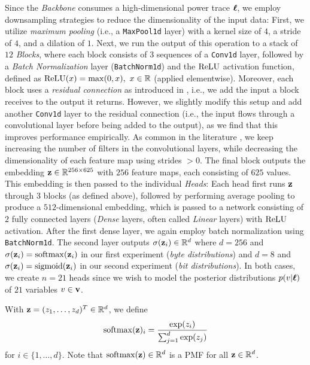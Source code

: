 Since the \emph{Backbone} consumes a high-dimensional power trace $\boldsymbol{\ell}$, we employ downsampling strategies to reduce the dimensionality of the input data: First, we utilize \emph{maximum pooling} (i.e., a \texttt{MaxPool1d} layer) with a kernel size of $4$, a stride of $4$, and a dilation of $1$. Next, we run the output of this operation to a stack of $12$ \emph{Blocks}, where each block consists of $3$ sequences of a \texttt{Conv1d} layer, followed by a \emph{Batch Normalization} layer \cite{batchnorm} (\texttt{BatchNorm1d}) and the $\operatorname{ReLU}$ activation function, defined as $\operatorname{ReLU}(x) = \max(0, x), \ x \in \mathbb{R}$ (applied elementwise). Moreover, each block uses a \emph{residual connection} as introduced in \cite{resnet}, i.e., we add the input a block receives to the output it returns. However, we slightly modify this setup and add another \texttt{Conv1d} layer to the residual connection (i.e., the input flows through a convolutional layer before being added to the output), as we find that this improves performance empirically. As common in the literature \cite{cnn_lecun}, we keep increasing the number of filters in the convolutional layers, while decreasing the dimensionality of each feature map using strides $> 0$. The final block outputs the embedding $\mathbf{z} \in \mathbb{R}^{256 \times 625}$ with $256$ feature maps, each consisting of $625$ values. This embedding is then passed to the individual \emph{Heads}: Each head first runs $\mathbf{z}$ through $3$ blocks (as defined above), followed by performing average pooling to produce a $512$-dimensional embedding, which is passed to a network consisting of $2$ fully connected layers (\emph{Dense} layers, often called \emph{Linear} layers) with $\operatorname{ReLU}$ activation. After the first dense layer, we again employ batch normalization using \texttt{BatchNorm1d}. The second layer outputs $\sigma(\mathbf{z}_i) \in \mathbb{R}^d$ where $d=256$ and $\sigma(\mathbf{z}_i) = \operatorname{softmax}(\mathbf{z}_i)$ in our first experiment (\emph{byte distributions}) and $d=8$ and $\sigma(\mathbf{z}_i) = \operatorname{sigmoid}(\mathbf{z}_i)$ in our second experiment (\emph{bit distributions}). In both cases, we create $n=21$ heads since we wish to model the posterior distributions $p(v|\boldsymbol{\ell})$ of $21$ variables $v \in \mathbf{v}$.

\begin{definition}
    With $\mathbf{z} = (z_1,\dots,z_d)^T \in \mathbb{R}^d$, we define
    \begin{align}
        \operatorname{softmax}(\mathbf{z})_i = \frac{\exp(z_i)}{\sum_{j=1}^d \exp(z_j)}
    \end{align}
    for $i \in \{1,\dots,d\}$.
    Note that $\operatorname{softmax}(\mathbf{z}) \in \mathbb{R}^d$ is a PMF for all $\mathbf{z} \in \mathbb{R}^d$.
\end{definition}

